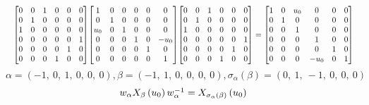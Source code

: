 \documentclass[11pt]{article}
\theoremstyle{definition}
\begin{document}
\[
\scaletoalign{\textwidth}{{\left[\begin{matrix}0 & 0 & 1 & 0 & 0 & 0\\0 & 1 & 0 & 0 & 0 & 0\\1 & 0 & 0 & 0 & 0 & 0\\0 & 0 & 0 & 0 & 0 & 1\\0 & 0 & 0 & 0 & 1 & 0\\0 & 0 & 0 & 1 & 0 & 0\end{matrix}\right]} {\left[\begin{matrix}1 & 0 & 0 & 0 & 0 & 0\\0 & 1 & 0 & 0 & 0 & 0\\u_{0} & 0 & 1 & 0 & 0 & 0\\0 & 0 & 0 & 1 & 0 & - u_{0}\\0 & 0 & 0 & 0 & 1 & 0\\0 & 0 & 0 & 0 & 0 & 1\end{matrix}\right]} {\left[\begin{matrix}0 & 0 & 1 & 0 & 0 & 0\\0 & 1 & 0 & 0 & 0 & 0\\1 & 0 & 0 & 0 & 0 & 0\\0 & 0 & 0 & 0 & 0 & 1\\0 & 0 & 0 & 0 & 1 & 0\\0 & 0 & 0 & 1 & 0 & 0\end{matrix}\right]} = {\left[\begin{matrix}1 & 0 & u_{0} & 0 & 0 & 0\\0 & 1 & 0 & 0 & 0 & 0\\0 & 0 & 1 & 0 & 0 & 0\\0 & 0 & 0 & 1 & 0 & 0\\0 & 0 & 0 & 0 & 1 & 0\\0 & 0 & 0 & - u_{0} & 0 & 1\end{matrix}\right]}}
\]
\[
\alpha = \left( -1, \  0, \  1, \  0, \  0, \  0\right), \beta = \left( -1, \  1, \  0, \  0, \  0, \  0\right), \sigma_{\alpha}(\beta) = \left( 0, \  1, \  -1, \  0, \  0, \  0\right)
\]
\[
\scaletoalign{\textwidth}{w_{\alpha} X_{\beta}\left(u_{0}\right) w_{\alpha}^{-1} = X_{\sigma_{\alpha}\left(\beta\right)}\left(u_{0}\right)}
\]
\end{document}
